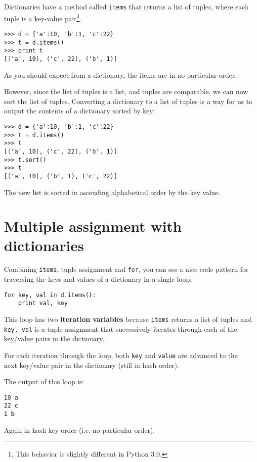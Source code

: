 
Dictionaries have a method called {\tt items} that returns a list of
tuples, where each tuple is a key-value 
pair\footnote{This behavior is slightly different in Python 3.0.}.

\beforeverb
\begin{verbatim}
>>> d = {'a':10, 'b':1, 'c':22}
>>> t = d.items()
>>> print t
[('a', 10), ('c', 22), ('b', 1)]
\end{verbatim}
\afterverb
%
As you should expect from a dictionary, the items are in no
particular order.

However, since the list of tuples is a list, and tuples are comparable,
we can now sort the list of tuples.  Converting a dictionary
to a list of tuples is a way for us to output the contents of a 
dictionary sorted by key:

\beforeverb
\begin{verbatim}
>>> d = {'a':10, 'b':1, 'c':22}
>>> t = d.items()
>>> t
[('a', 10), ('c', 22), ('b', 1)]
>>> t.sort()
>>> t
[('a', 10), ('b', 1), ('c', 22)]
\end{verbatim}
\afterverb
%
The new list is sorted in ascending alphabetical order by the key value.

\section{Multiple assignment with dictionaries}


Combining {\tt items}, tuple assignment and {\tt for}, you
can see a nice code pattern for traversing the keys and values of a dictionary
in a single loop:

\beforeverb
\begin{verbatim}
for key, val in d.items():
    print val, key
\end{verbatim}
\afterverb
%
This loop has two {\bf iteration variables} because {\tt items} returns
a list of tuples and {\tt key, val} is a tuple assignment
that successively iterates through each of the key/value pairs in the dictionary.  

For each iteration
through the loop, both {\tt key} and {\tt value} are advanced to the
next key/value pair in the dictionary (still in hash order).

The output of this loop is:

\beforeverb
\begin{verbatim}
10 a
22 c
1 b
\end{verbatim}
\afterverb
%
Again in hash key order (i.e. no particular order).

